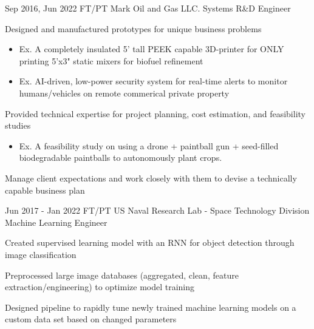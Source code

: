 \documentclass[
	10pt, %
]{FreemanCV}
\begin{document}
\jobentry
	{Sep 2016, Jun 2022} %
	{FT/PT} %
	{Mark Oil and Gas LLC.} %
	{Systems R\&D Engineer} %
	{ %
		\item Designed and manufactured prototypes for unique business problems
		\begin{itemize}[topsep=-10pt]
			\itemsep-5pt
			\item Ex. A completely insulated 5' tall PEEK capable 3D-printer for ONLY printing 5'x3" static mixers for biofuel refinement
			\item Ex. AI-driven, low-power security system for real-time alerts to monitor humans/vehicles on remote commerical private property
		\end{itemize}
		\item Provided technical expertise for project planning, cost estimation, and feasibility studies
		\begin{itemize}[topsep=-10pt]
			\itemsep-5pt
			\item Ex. A feasibility study on using a drone + paintball gun + seed-filled biodegradable paintballs to autonomously plant crops.
		\end{itemize}
		\item Manage client expectations and work closely with them to devise a technically capable business plan
	}
	


\jobentry
	{Jun 2017 - Jan 2022} %
	{FT/PT} %
	{US Naval Research Lab - Space Technology Division} %
	{Machine Learning Engineer} %
	{ %
		\item Created supervised learning model with an RNN for object detection through image classification
		\item Preprocessed large image databases (aggregated, clean, feature extraction/engineering) to optimize model training
		\item Designed pipeline to rapidly tune newly trained machine learning models on a custom data set based on changed parameters
	} 


\vspace*{-10pt}
\end{document}
